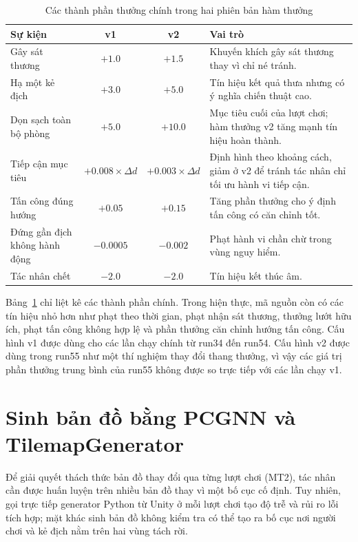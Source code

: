 \begin{table}[H]
    \centering
    \small
    \caption{Các thành phần thưởng chính trong hai phiên bản hàm thưởng}
    \label{tab:reward_components}
    \begin{tabular}{|p{4.4cm}|c|c|p{5.2cm}|}
        \hline
        \textbf{Sự kiện} & \textbf{v1} & \textbf{v2} & \textbf{Vai trò} \\
        \hline
        Gây sát thương & $+1.0$ & $+1.5$ & Khuyến khích gây sát thương thay vì chỉ né tránh. \\
        \hline
        Hạ một kẻ địch & $+3.0$ & $+5.0$ & Tín hiệu kết quả thưa nhưng có ý nghĩa chiến thuật cao. \\
        \hline
        Dọn sạch toàn bộ phòng & $+5.0$ & $+10.0$ & Mục tiêu cuối của lượt chơi; hàm thưởng v2 tăng mạnh tín hiệu hoàn thành. \\
        \hline
        Tiếp cận mục tiêu & $+0.008 \times \Delta d$ & $+0.003 \times \Delta d$ & Định hình theo khoảng cách, giảm ở v2 để tránh tác nhân chỉ tối ưu hành vi tiếp cận. \\
        \hline
        Tấn công đúng hướng & $+0.05$ & $+0.15$ & Tăng phần thưởng cho ý định tấn công có căn chỉnh tốt. \\
        \hline
        Đứng gần địch không hành động & $-0.0005$ & $-0.002$ & Phạt hành vi chần chừ trong vùng nguy hiểm. \\
        \hline
        Tác nhân chết & $-2.0$ & $-2.0$ & Tín hiệu kết thúc âm. \\
        \hline
    \end{tabular}
\end{table}

Bảng~\ref{tab:reward_components} chỉ liệt kê các thành phần chính. Trong hiện thực, mã nguồn còn có các tín hiệu nhỏ hơn như phạt theo thời gian, phạt nhận sát thương, thưởng lướt hữu ích, phạt tấn công không hợp lệ và phần thưởng căn chỉnh hướng tấn công. Cấu hình v1 được dùng cho các lần chạy chính từ run34 đến run54. Cấu hình v2 được dùng trong run55 như một thí nghiệm thay đổi thang thưởng, vì vậy các giá trị phần thưởng trung bình của run55 không được so trực tiếp với các lần chạy v1.

\section{Sinh bản đồ bằng PCGNN và TilemapGenerator}

Để giải quyết thách thức bản đồ thay đổi qua từng lượt chơi (MT2), tác nhân cần được huấn luyện trên nhiều bản đồ thay vì một bố cục cố định. Tuy nhiên, gọi trực tiếp generator Python từ Unity ở mỗi lượt chơi tạo độ trễ và rủi ro lỗi tích hợp; mặt khác sinh bản đồ không kiểm tra có thể tạo ra bố cục nơi người chơi và kẻ địch nằm trên hai vùng tách rời.

